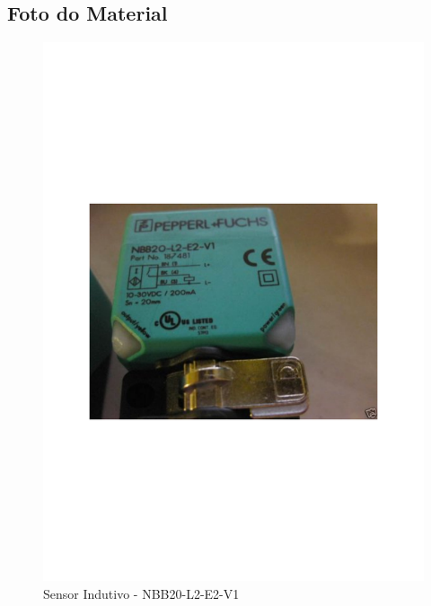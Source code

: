 \newpage

\subsection{Foto do Material}
\begin{figure}[H]
 \centering
 \includegraphics[width=1\columnwidth]{Indutivo/foto}
 \caption{Sensor Indutivo - NBB20-L2-E2-V1 }
\end{figure}
\newpage


